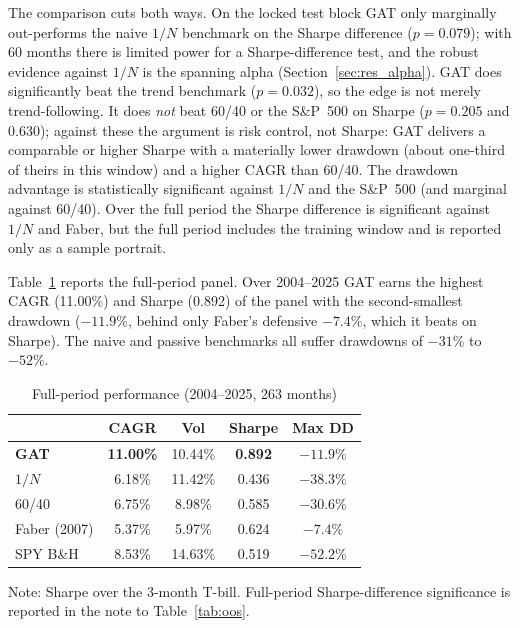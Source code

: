 The comparison cuts both ways. On the locked test block GAT only marginally
out-performs the naive $1/N$ benchmark on the Sharpe difference ($p = 0.079$); with
60 months there is limited power for a Sharpe-difference test, and the robust
evidence against $1/N$ is the spanning alpha (Section~\ref{sec:res_alpha}). GAT does
significantly beat the \citet{faber2007} trend benchmark ($p = 0.032$), so the edge
is not merely trend-following. It does \emph{not} beat 60/40 or the S\&P~500 on
Sharpe ($p = 0.205$ and $0.630$); against these the argument is risk control, not
Sharpe: GAT delivers a comparable or higher Sharpe with a materially lower drawdown
(about one-third of theirs in this window) and a higher CAGR than 60/40. The
drawdown advantage is statistically significant against $1/N$ and the S\&P~500
(and marginal against 60/40). Over the full period the Sharpe difference is
significant against $1/N$ and Faber, but the full
period includes the training window and is reported only as a sample portrait.

Table~\ref{tab:full} reports the full-period panel. Over 2004--2025 GAT earns the
highest CAGR (11.00\%) and Sharpe (0.892) of the panel with the second-smallest
drawdown ($-11.9\%$, behind only Faber's defensive $-7.4\%$, which it beats on
Sharpe). The naive and passive benchmarks all suffer drawdowns of $-31\%$ to
$-52\%$.

\begin{table}[H]
\centering
\caption{Full-period performance (2004--2025, 263 months)}
\label{tab:full}
\small
\begin{tabular}{lcccc}
\toprule
& CAGR & Vol & Sharpe & Max DD \\
\midrule
\textbf{GAT} & \textbf{11.00\%} & 10.44\% & \textbf{0.892} & \textbf{$-11.9\%$} \\
$1/N$        & 6.18\%  & 11.42\% & 0.436 & $-38.3\%$ \\
60/40        & 6.75\%  & 8.98\%  & 0.585 & $-30.6\%$ \\
Faber (2007) & 5.37\%  & 5.97\%  & 0.624 & $-7.4\%$ \\
SPY B\&H     & 8.53\%  & 14.63\% & 0.519 & $-52.2\%$ \\
\bottomrule
\end{tabular}
\begin{flushleft}
\footnotesize Note: Sharpe over the 3-month T-bill. Full-period Sharpe-difference
significance is reported in the note to Table~\ref{tab:oos}.
\end{flushleft}
\end{table}

